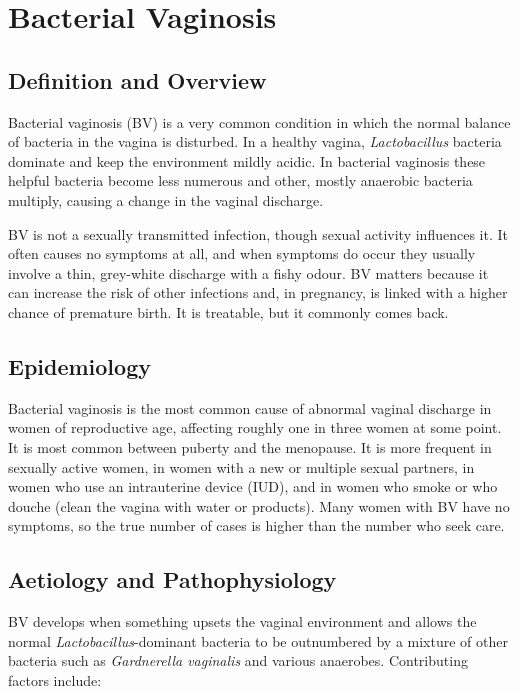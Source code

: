 \chapter{Bacterial Vaginosis}

\section*{Definition and Overview}
Bacterial vaginosis (BV) is a very common condition in which the normal balance of bacteria in the vagina is disturbed. In a healthy vagina, \textit{Lactobacillus} bacteria dominate and keep the environment mildly acidic. In bacterial vaginosis these helpful bacteria become less numerous and other, mostly anaerobic bacteria multiply, causing a change in the vaginal discharge.

BV is not a sexually transmitted infection, though sexual activity influences it. It often causes no symptoms at all, and when symptoms do occur they usually involve a thin, grey-white discharge with a fishy odour. BV matters because it can increase the risk of other infections and, in pregnancy, is linked with a higher chance of premature birth. It is treatable, but it commonly comes back.

\section*{Epidemiology}
Bacterial vaginosis is the most common cause of abnormal vaginal discharge in women of reproductive age, affecting roughly one in three women at some point. It is most common between puberty and the menopause. It is more frequent in sexually active women, in women with a new or multiple sexual partners, in women who use an intrauterine device (IUD), and in women who smoke or who douche (clean the vagina with water or products). Many women with BV have no symptoms, so the true number of cases is higher than the number who seek care.

\section*{Aetiology and Pathophysiology}
BV develops when something upsets the vaginal environment and allows the normal \textit{Lactobacillus}-dominant bacteria to be outnumbered by a mixture of other bacteria such as \textit{Gardnerella vaginalis} and various anaerobes. Contributing factors include:

